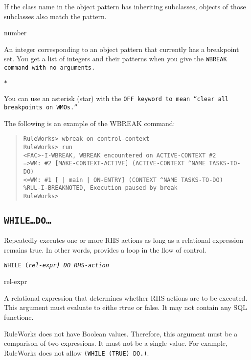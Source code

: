 {{\begin{arguments}
  If the class name in the object pattern has inheriting subclasses,
  objects of those subclasses also match the pattern.

\item[number]

  An integer corresponding to an object pattern that currently has a
  breakpoint set. You get a list of integers and their patterns when
  you give the \tt{WBREAK} command with no arguments.

\item[\tt{*}]

  You can use an asterisk (star) with the \tt{OFF} keyword to mean
  ``clear all breakpoints on WMOs.''
\end{arguments}

\Example

The following is an example of the WBREAK command:

\begin{quote}
\begin{verbatim}
RuleWorks> wbreak on control-context
RuleWorks> run
<FAC>-I-WBREAK, WBREAK encountered on ACTIVE-CONTEXT #2
=>WM: #2 [MAKE-CONTEXT-ACTIVE] (ACTIVE-CONTEXT ^NAME TASKS-TO-DO)
<=WM: #1 [ | main | ON-ENTRY] (CONTEXT ^NAME TASKS-TO-DO)
%RUL-I-BREAKNOTED, Execution paused by break
RuleWorks>
\end{verbatim}
\end{quote}

\subsection{\tt{WHILE}\ldots\tt{DO}\ldots}

Repeatedly executes one or more RHS actions as long as a relational
expression remains true. In other words, provides a loop in the flow
of control.

\Format

\tt{WHILE} \tt(\it{rel-expr}\tt) \tt{DO} \it{RHS-action}

\begin{arguments}
\item[rel-expr]

  A relational expression that determines whether RHS actions are to
  be executed. This argument must evaluate to eithe rtrue or false. It
  may not contain any SQL functionc.

\begin{note}
  RuleWorks does not have Boolean values. Therefore, this argument
  must be a comparison of two expressions. It must not be a single
  value. For example, RuleWorks does not allow
  \verb|(WHILE (TRUE) DO.)|.
\end{note}


\end{arguments}}}
